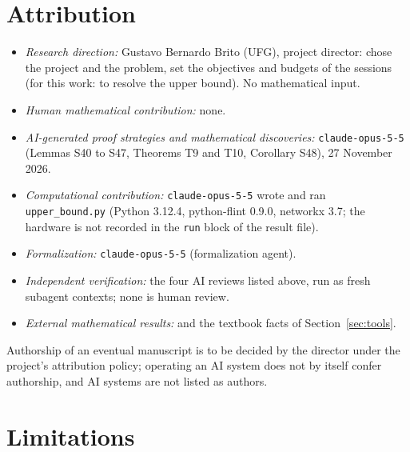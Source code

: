 \documentclass[11pt]{amsart}
\theoremstyle{definition}
\theoremstyle{remark}
\begin{document}
\section*{Attribution}

\begin{itemize}
\item \emph{Research direction:} Gustavo Bernardo Brito (UFG), project
director: chose the project and the problem, set the objectives and budgets
of the sessions (for this work: to resolve the upper bound). No mathematical
input.
\item \emph{Human mathematical contribution:} none.
\item \emph{AI-generated proof strategies and mathematical discoveries:}
\nolinkurl{claude-opus-5-5} (Lemmas S40 to S47, Theorems T9 and T10,
Corollary S48), 27 November 2026.
\item \emph{Computational contribution:} \nolinkurl{claude-opus-5-5} wrote and
ran \nolinkurl{upper_bound.py} (Python 3.12.4, python-flint 0.9.0, networkx 3.7;
the hardware is not recorded in the \texttt{run} block of the result file).
\item \emph{Formalization:} \nolinkurl{claude-opus-5-5} (formalization agent).
\item \emph{Independent verification:} the four AI reviews listed above, run
as fresh subagent contexts; none is human review.
\item \emph{External mathematical results:} \cite{GL78,GP71,Dar64,Pit97,Mer90,Col89,AAB,AMW}
and the textbook facts of Section~\ref{sec:tools}.
\end{itemize}
Authorship of an eventual manuscript is to be decided by the director under
the project's attribution policy; operating an AI system does not by itself
confer authorship, and AI systems are not listed as authors.

\section*{Limitations}
\end{document}

